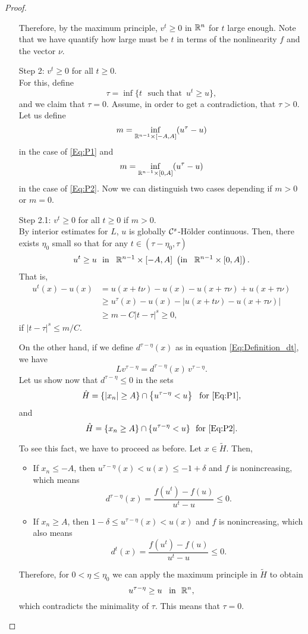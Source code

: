 \begin{proof}
\begin{enumerate}
Therefore, by the maximum principle, $v^t\geq 0$ in $\mathbb{R}^n$ for $t$ large enough. Note that we have quantify how large must be $t$ in terms of the nonlinearity $f$ and the vector $\nu$.

\item[Step 2:] $v^t\geq 0$ for all $t\geq 0$.\\
For this, define 
$$\tau = \inf \{t \,\,\text{ such that }\, u^t\geq u\}, $$ 
and we claim that $\tau=0$. Assume, in order to get a contradiction, that $\tau>0$. Let us define
$$ m = \inf_{\mathbb{R}^{n-1}\times [-A,A]} (u^\tau - u) $$
in the case of \eqref{Eq:P1} and
$$ m = \inf_{\mathbb{R}^{n-1}\times [0,A]} (u^\tau - u) $$
in the case of \eqref{Eq:P2}. Now we can distinguish two cases depending if $m>0$ or $m=0$.

\item[Step 2.1:] $v^t\geq 0$ for all $t\geq 0$ if $m>0$.\\
By interior estimates for $L$, $u$ is globally $\mathcal{C}^{s}$-H\"older continuous. Then, there exists $\eta_0$ small so that for any $t\in(\tau-\eta_0,\tau)$ 
$$ u^t\geq u \,\,\,\, \textrm{in }\,\,\, \mathbb{R}^{n-1}\times [-A,A] \,\, \left( \textrm{in }\,\,\, \mathbb{R}^{n-1}\times [0,A] \right). $$
That is,
\begin{align*}
u^t(x)-u(x) &= u(x+t\nu)-u(x)-u(x+\tau\nu)+u(x+\tau\nu) \\
& \geq u^\tau(x)-u(x) - |u(x+t\nu)-u(x+\tau\nu)| \\
& \geq m - C|t-\tau|^s \geq 0,
\end{align*}
if $|t-\tau|^s\leq m/C$.

On the other hand, if we define $d^{\tau-\eta}(x)$ as in equation \eqref{Eq:Definition_dt}, we have
$$ L v^{\tau-\eta} = d^{\tau-\eta} (x) \,v^{\tau-\eta}. $$
Let us show now that $d^{\tau-\eta}\leq 0$ in the sets
$$ \hat{H} = \left\{|x_n|\geq A\right\} \cap \left\{u^{\tau-\eta}<u\right\}  \,\,\,\, \textrm{for \eqref{Eq:P1}}, $$
and
$$ \hat{H} = \{x_n\geq A\} \cap \{u^{\tau-\eta}<u\}  \,\,\,\, \textrm{for \eqref{Eq:P2}}. $$

To see this fact, we have to proceed as before. Let $x\in \tilde{H}$. Then,
\begin{itemize}
\item If $x_n\leq -A$, then $u^{\tau-\eta}(x) < u(x) \leq -1+\delta$ and $f$ is nonincreasing, which means
$$ d^{\tau-\eta}(x) = \frac{f(u^t) - f(u)}{u^t-u} \leq 0.  $$
\item If $x_n\geq A$, then $1-\delta \leq u^{\tau-\eta}(x) < u(x) $ and $f$ is nonincreasing, which also means
$$ d^t(x) = \frac{f(u^t) - f(u)}{u^t-u} \leq 0.  $$
\end{itemize}
Therefore, for $0<\eta \leq \eta_0$ we can apply the maximum principle in $\tilde{H}$ to obtain
$$ u^{\tau-\eta} \geq u \,\,\, \text{ in } \,\, \mathbb{R}^n, $$
which contradicts the minimality of $\tau$. This means that $\tau = 0$.


\end{enumerate}
\end{proof}
